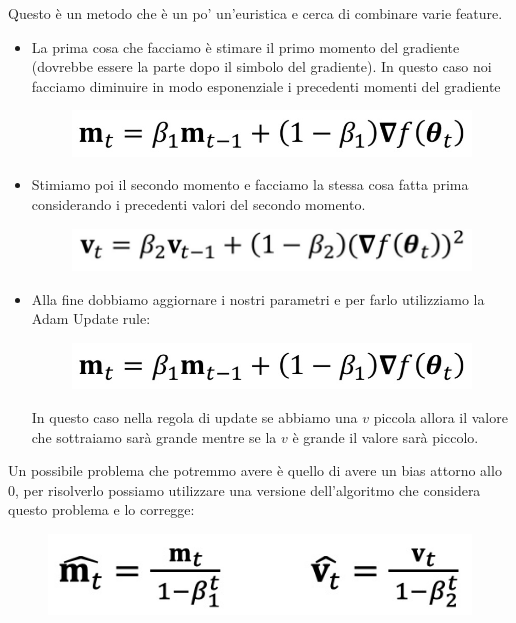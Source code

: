 \documentclass[14pt]{extreport}
\begin{document}
Questo è un metodo che è un po' un'euristica e cerca di combinare varie feature.

\begin{itemize}
\item La prima cosa che facciamo è stimare il primo momento del gradiente (dovrebbe essere la parte dopo il simbolo del gradiente). In questo caso noi
facciamo diminuire in modo esponenziale i precedenti momenti del gradiente\begin{figure}[H]
\centering
\includegraphics[width=0.7\linewidth]{251.jpeg}
\end{figure}
\item Stimiamo poi il secondo momento e facciamo la stessa cosa fatta prima considerando i precedenti valori del secondo momento. \begin{figure}[H]
\centering
\includegraphics[width=0.7\linewidth]{252.jpeg}
\end{figure}
\item Alla fine dobbiamo aggiornare i nostri parametri e per farlo utilizziamo la Adam Update rule:\begin{figure}[H]
\centering
\includegraphics[width=0.7\linewidth]{253.jpeg}
\end{figure} In questo caso nella regola di update se abbiamo una $v$ piccola allora il valore che sottraiamo sarà grande mentre se la $v$ è grande il
valore sarà piccolo.
\end{itemize}

Un possibile problema che potremmo avere è quello di avere un bias attorno allo 0, per risolverlo possiamo utilizzare una versione dell'algoritmo che
considera questo problema e lo corregge:

\begin{figure}[H]
\centering
\includegraphics[width=0.5\linewidth]{255.jpeg}
\end{figure}
\end{document}
